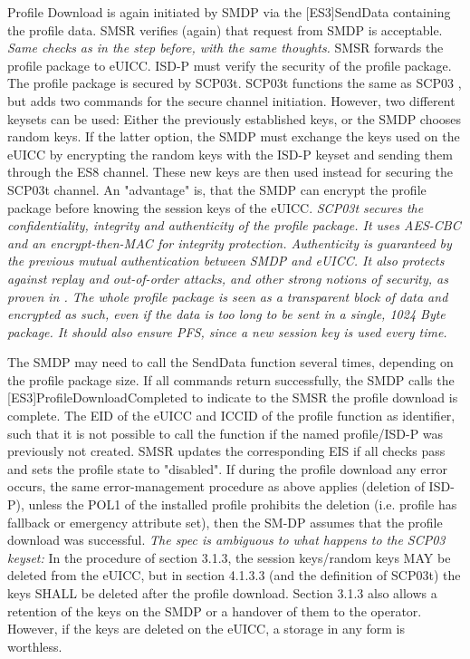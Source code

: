 Profile Download is again initiated by SMDP via the [ES3]SendData containing the profile data. SMSR verifies (again) that request from SMDP is acceptable. \textit{Same checks as in the step before, with the same thoughts.}
SMSR forwards the profile package to eUICC. ISD-P must verify the security of the profile package. 
The profile package is secured by SCP03t. SCP03t functions the same as SCP03 \parencite{GPC:AmendE}, but adds two commands for the secure channel initiation. However, two different keysets can be used: Either the previously established keys, or the SMDP chooses random keys. If the latter option, the SMDP must exchange the keys used on the eUICC by encrypting the random keys with the ISD-P keyset and sending them through the ES8 channel. These new keys are then used instead for securing the SCP03t channel. An "advantage" is, that the SMDP can encrypt the profile package before knowing the session keys of the eUICC. \textit{SCP03t secures the confidentiality, integrity and authenticity of the profile package. It uses AES-CBC and an encrypt-then-MAC for integrity protection. Authenticity is guaranteed by the previous mutual authentication between SMDP and eUICC. It also protects against replay and out-of-order attacks, and other strong notions of security, as proven in \parencite{Sabt:CryptanGPSCP}. The whole profile package is seen as a transparent block of data and encrypted as such, even if the data is too long to be sent in a single, 1024 Byte package. It should also ensure PFS, since a new session key is used every time.}

The SMDP may need to call the SendData function several times, depending on the profile package size. If all commands return successfully, the SMDP calls the [ES3]ProfileDownloadCompleted to indicate to the SMSR the profile download is complete. The EID of the eUICC and ICCID of the profile function as identifier, such that it is not possible to call the function if the named profile/ISD-P was previously not created. SMSR updates the corresponding EIS if all checks pass and sets the profile state to "disabled". If during the profile download any error occurs, the same error-management procedure as above applies (deletion of ISD-P), unless the POL1 of the installed profile prohibits the deletion (i.e. profile has fallback or emergency attribute set), then the SM-DP assumes that the profile download was successful.
\textit{The spec is ambiguous to what happens to the SCP03 keyset:} In the procedure of section 3.1.3, the session keys/random keys MAY be deleted from the eUICC, but in section 4.1.3.3 (and the definition of SCP03t) the keys SHALL be deleted after the profile download. Section 3.1.3 also allows a retention of the keys on the SMDP or a handover of them to the operator. However, if the keys are deleted on the eUICC, a storage in any form is worthless.

